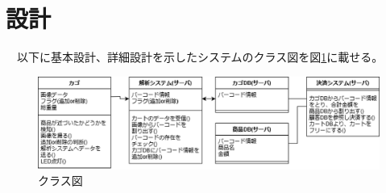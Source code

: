 \section{設計}
　以下に基本設計、詳細設計を示したシステムのクラス図\cite{v_model}を図\ref{class}に載せる。
\begin{figure}[htbp]
\centering
\includegraphics[width=15cm]{./pic/class_final.eps}
\caption{クラス図}
\label{class}
\end{figure}

